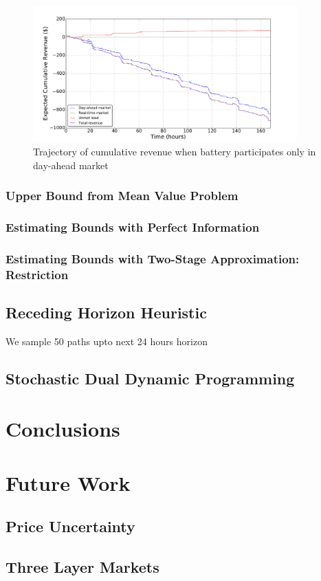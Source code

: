 \documentclass[11pt,twoside]{article}
\begin{document}
\begin{figure}[h!]
\begin{center}
\includegraphics[width=4in]
{Figures/Plots/onlydam/cumulative_rev_fp_st.pdf} \caption{Trajectory of cumulative revenue when battery participates only in day-ahead market}\label{fig:cumulative_rev_onlydam}\end{center}
\end{figure}


\subsubsection{Upper Bound from Mean Value Problem}


\subsubsection{Estimating Bounds with Perfect Information}
\subsubsection{Estimating Bounds with Two-Stage 	Approximation: Restriction}
\subsection{Receding Horizon Heuristic}
We sample 50 paths upto next 24 hours horizon 
\subsection{Stochastic Dual Dynamic Programming}
\section{Conclusions}
\section{Future Work}
\subsection{Price Uncertainty}
\subsection{Three Layer Markets}




\end{document}

